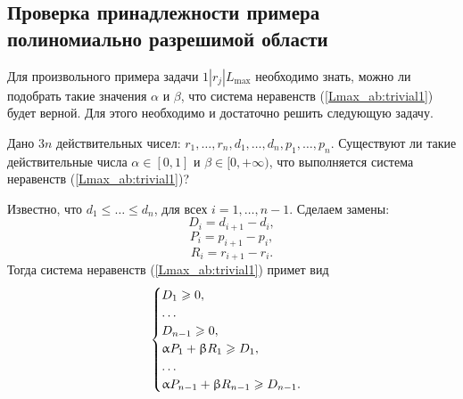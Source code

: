 \subsection{Проверка принадлежности примера полиномиально разрешимой области}
Для произвольного примера задачи $1|r_j| L_{\max}$ необходимо знать, можно ли подобрать такие значения $\alpha$ и $\beta$, что система неравенств (\ref{Lmax_ab:trivial1}) будет верной. Для этого необходимо и достаточно решить следующую задачу.
\begin{problem}\label{Lmax_ab:pr:3}
Дано $3n$ действительных чисел: $r_1, \dots, r_n, d_1, \dots, d_n, p_1, \dots, p_n$. Существуют ли такие действительные числа $\alpha \in [0, 1]$ и $\beta \in [0, + \infty)$, что выполняется система неравенств (\ref{Lmax_ab:trivial1})?
\end{problem}

Известно, что $d_1 \leq \dots \leq d_n$, для всех $i=1, \dots, n-1$. Сделаем замены:
$$D_i = d_{i+1} - d_i,$$
$$P_i = p_{i+1} - p_i,$$
$$R_i = r_{i+1} - r_i.$$
Тогда система неравенств (\ref{Lmax_ab:trivial1}) примет вид\\
\begin{equation}{\label{Lmax_ab:trivial4}}
\begin{cases}
    D_1 \geq 0,\\
    \dots\\
    D_{n-1} \geq 0,\\
    \alpha P_1 + \beta R_1 \geq D_1,\\
    \dots\\
    \alpha P_{n-1} + \beta R_{n-1} \geq D_{n-1}.
\end{cases}
\end{equation}

